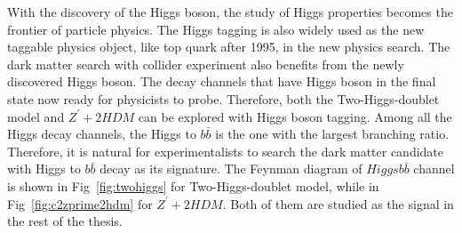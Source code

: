 \par With the discovery of the Higgs boson, the study of Higgs properties becomes the frontier of particle physics. The Higgs tagging is also widely used as the new taggable physics object, like top quark after 1995, in the new physics search. The dark matter search with collider experiment also benefits from the newly discovered Higgs boson. The decay channels that have Higgs boson in the final state now ready for physicists to probe. Therefore, both the Two-Higgs-doublet model and $Z^{\prime}+2HDM$ can be explored with Higgs boson tagging. Among all the Higgs decay channels, the Higgs to $b\bar{b}$ is the one with the largest branching ratio. Therefore, it is natural for experimentalists to search the dark matter candidate with Higgs to $b\bar{b}$ decay as its signature. The Feynman diagram of $Higgs b\bar{b}$ channel is shown in Fig~\ref{fig:twohiggs} for Two-Higgs-doublet model, while in Fig~\ref{fig:c2zprime2hdm} for $Z^{\prime}+2HDM$. Both of them are studied as the signal in the rest of the thesis.
